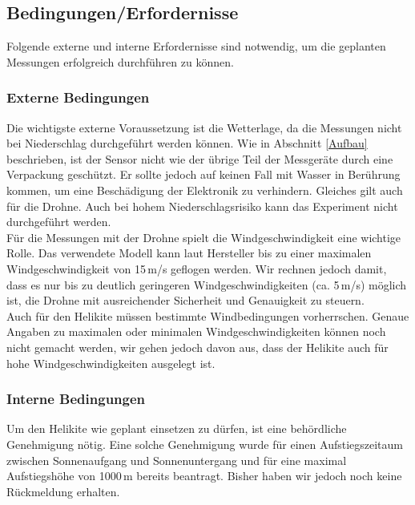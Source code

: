 \documentclass[a4paper,11pt,DIV=calc,tablecaptionabove,headinclude,twoside]{article}
\begin{document}
\subsection{Bedingungen/Erfordernisse}
\label{Bedingungen}

Folgende externe und interne Erfordernisse sind notwendig, um die geplanten Messungen erfolgreich durchführen zu können.

\subsubsection{Externe Bedingungen}

Die wichtigste externe Voraussetzung ist die Wetterlage, da die Messungen nicht bei Niederschlag durchgeführt werden können. Wie in Abschnitt \ref{Aufbau} beschrieben, ist der Sensor nicht wie der übrige Teil der Messgeräte durch eine Verpackung geschützt. Er sollte jedoch auf keinen Fall mit Wasser in Berührung kommen, um eine Beschädigung der Elektronik zu verhindern. Gleiches gilt auch für die Drohne. Auch bei hohem Niederschlagsrisiko kann das Experiment nicht durchgeführt werden. \\

Für die Messungen mit der Drohne spielt die Windgeschwindigkeit eine wichtige Rolle. Das verwendete Modell kann laut Hersteller bis zu einer maximalen Windgeschwindigkeit von 15\,m/s geflogen werden. Wir rechnen jedoch damit, dass es nur bis zu deutlich geringeren Windgeschwindigkeiten (ca. 5\,m/s) möglich ist, die Drohne mit ausreichender Sicherheit und Genauigkeit zu steuern. \\

Auch für den Helikite müssen bestimmte Windbedingungen vorherrschen. Genaue Angaben zu maximalen oder minimalen Windgeschwindigkeiten können noch nicht gemacht werden, wir gehen jedoch davon aus, dass der Helikite auch für hohe Windgeschwindigkeiten ausgelegt ist. \\

\subsubsection{Interne Bedingungen}

Um den Helikite wie geplant einsetzen zu dürfen, ist eine behördliche Genehmigung nötig. Eine solche Genehmigung wurde für einen Aufstiegszeitaum zwischen Sonnenaufgang und Sonnenuntergang und für eine maximal Aufstiegshöhe von 1000\,m bereits beantragt. Bisher haben wir jedoch noch keine Rückmeldung erhalten.\\
\end{document}
